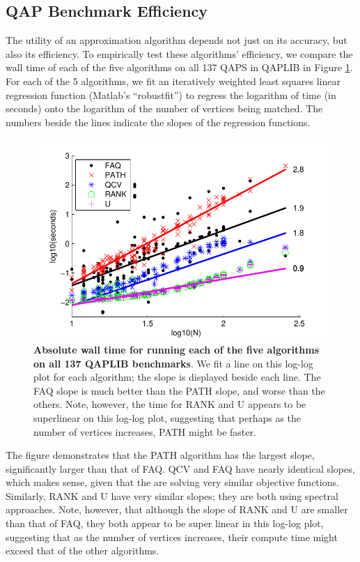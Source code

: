 \documentclass[10pt]{article}
\begin{document}
\subsection{QAP Benchmark Efficiency} 
\label{sub:efficiency}


The utility of an approximation algorithm depends not just on its accuracy, but also its efficiency.
To empirically test these algorithms' efficiency, we compare the wall time of each of the five algorithms on all 137 QAPS in QAPLIB in Figure \ref{fig:allEfficiency}.  For each of the 5 algorithms, we fit an iteratively weighted least squares linear regression function (Matlab's ``robustfit'') to regress the logarithm of time (in seconds) onto the logarithm of the number of vertices being matched.  The numbers beside the lines indicate the slopes of the regression functions.  

\begin{figure}[htbp]
	\centering
		\includegraphics[height=3in]{Figure3.pdf}
	\caption{{\bf Absolute wall time for running each of the five algorithms on all 137 QAPLIB benchmarks}. We fit a line on this log-log plot for each algorithm; the slope is displayed beside each line. The FAQ slope is much better than the PATH slope, and worse than the others.  Note, however, the time for RANK and U appears to be superlinear on this log-log plot, suggesting that perhaps as the number of vertices increases, PATH might be faster. }
	\label{fig:allEfficiency}
\end{figure}
The figure demonstrates that the PATH algorithm has the largest slope, significantly larger than that of FAQ.  QCV and FAQ have nearly identical slopes, which makes sense, given that the are solving very similar objective functions.  Similarly, RANK and U have very similar slopes; they are both using spectral approaches.  Note, however, that although the slope of RANK and U are smaller than that of FAQ, they both appear to be super linear in this log-log plot, suggesting that as the number of vertices increases, their compute time might exceed that of the other algorithms.  
\end{document}

